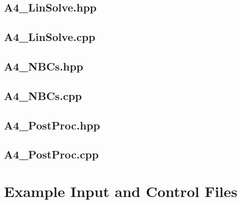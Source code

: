 \documentclass[a4paper, 12pt]{article}
\begin{document}
\newpage
\subsection{A4\_LinSolve.hpp} \label{subsec:LinSolve.hpp}


\newpage
\subsection{A4\_LinSolve.cpp} \label{subsec:LinSolve.cpp}


\newpage
\subsection{A4\_NBCs.hpp} \label{subsec:NBCs.hpp}


\newpage
\subsection{A4\_NBCs.cpp} \label{subsec:NBCs.cpp}


\newpage
\subsection{A4\_PostProc.hpp} \label{subsec:PostProc.hpp}


\newpage
\subsection{A4\_PostProc.cpp} \label{subsec:PostProc.cpp}


\newpage
\section{Example Input and Control Files}\label{sec:ExInput}
\end{document}
